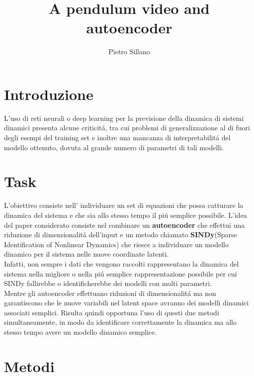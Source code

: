 \documentclass[11pt]{article}
\title{ A pendulum video and autoencoder }
\author{Pietro Sillano}
\begin{document}
\maketitle
\nocite{pytorch} 
\nocite{kchamp} 




\section{Introduzione}
L'uso di reti neurali o deep learning per la previsione della dinamica di sistemi dinamici presenta alcune criticitá, tra cui problemi di generalizzazione al di fuori degli esempi del training set e inoltre una mancanza di interpretabilitá del modello ottenuto, dovuta al grande numero di parametri di tali modelli.

\section{Task}
L'obiettivo consiste nell' individuare un set di equazioni che possa catturare la dinamica del sistema  e che sia allo stesso tempo il piú semplice possibile.
L'idea del paper considerato consiste nel combinare un \textbf{autoencoder} che effettui una riduzione di dimensionalitá dell'input e un metodo chiamato \textbf{SINDy}(Sparse Identification of Nonlinear Dynamics) che riesce a  individuare un modello dinamico per il sistema nelle nuove coordinate latenti. \\
Infatti, non sempre i dati che vengono raccolti rappresentano la dinamica del sistema nella migliore o nella piú semplice rappresentazione possibile per cui SINDy fallirebbe o identificherebbe dei modelli con molti parametri.\\
Mentre gli autoencoder effettuano riduzioni di dimensionalitá ma non garantiscono che le nuove variabili nel latent space avranno dei modelli dinamici associati semplici.
Risulta quindi opportuna l'uso di questi due metodi simultaneamente, in modo da identificare correttamente la dinamica ma allo stesso tempo avere un modello dinamico semplice.



\section{Metodi}
\end{document}
